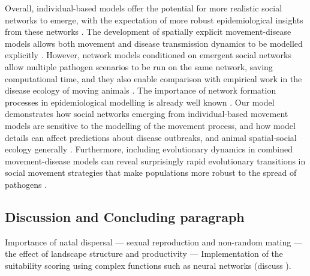 Overall, individual-based models offer the potential for more realistic social networks to emerge, with the expectation of more robust epidemiological insights from these networks \citep[][]{lunn2021}.
The development of spatially explicit movement-disease models allows both movement and disease transmission dynamics to be modelled explicitly \citep{white2018b,white2018,scherer2020,gupte2022c}.
However, network models conditioned on emergent social networks allow multiple pathogen scenarios to be run on the same network, saving computational time, and they also enable comparison with empirical work in the disease ecology of moving animals \citep{wilber2022}.
The importance of network formation processes in epidemiological modelling is already well known \citep[][]{white2017,wilber2022}.
Our model demonstrates how social networks emerging from individual-based movement models are sensitive to the modelling of the movement process, and how model details can affect predictions about disease outbreaks, and animal spatial-social ecology generally \citep{webber2018,webber2022}.
Furthermore, including evolutionary dynamics in combined movement-disease models can reveal surprisingly rapid evolutionary transitions in social movement strategies that make populations more robust to the spread of pathogens \citep{gupte2022c}.

\subsection{Discussion and Concluding paragraph}

Importance of natal dispersal --- sexual reproduction and non-random mating --- the effect of landscape structure and productivity --- Implementation of the suitability scoring using complex functions such as neural networks (discuss \cite{mueller2011,deangelis2019}).







